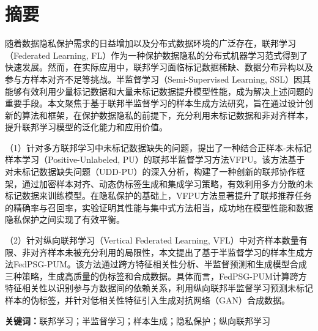 


\chapter{摘\quad 要}
\xiaosi

随着数据隐私保护需求的日益增加以及分布式数据环境的广泛存在，联邦学习（Federated Learning, FL）作为一种保护数据隐私的分布式机器学习范式得到了快速发展。然而，在实际应用中，联邦学习面临标记数据稀缺、数据分布异构以及参与方样本对齐不足等挑战。半监督学习（Semi-Supervised Learning, SSL）因其能够有效利用少量标记数据和大量未标记数据提升模型性能，成为解决上述问题的重要手段。本文聚焦于基于联邦半监督学习的样本生成方法研究，旨在通过设计创新的算法和框架，在保护数据隐私的前提下，充分利用未标记数据和非对齐样本，提升联邦学习模型的泛化能力和应用价值。  

（1）针对多方联邦学习中未标记数据缺失的问题，提出了一种结合正样本-未标记样本学习（Positive-Unlabeled, PU）的联邦半监督学习方法VFPU。该方法基于对未标记数据缺失问题（UDD-PU）的深入分析，构建了一种创新的联邦协作框架，通过加密样本对齐、动态伪标签生成和集成学习策略，有效利用多方分散的未标记数据来训练模型。在隐私保护的基础上，VFPU方法显著提升了联邦推荐任务的精确率与召回率，实验证明其性能与集中式方法相当，成功地在模型性能和数据隐私保护之间实现了有效平衡。 

（2）针对纵向联邦学习（Vertical Federated Learning, VFL）中对齐样本数量有限、非对齐样本未被充分利用的局限性，本文提出了基于半监督学习的样本生成方法FedPSG-PUM。该方法通过跨方特征相关性分析、半监督预测和生成模型合成三种策略，生成高质量的伪标签和合成数据。具体而言，FedPSG-PUM计算跨方特征相关性以识别参与方数据间的依赖关系，利用纵向联邦半监督学习预测未标记样本的伪标签，并针对低相关性特征引入生成对抗网络（GAN）合成数据。 
  
\noindent\songti\textbf{关键词：}联邦学习；半监督学习；样本生成；隐私保护；纵向联邦学习

\clearpage